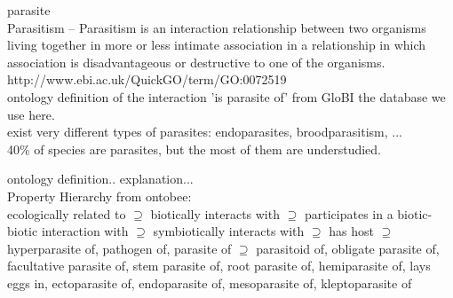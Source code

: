     \begin{definition} parasite \\
      Parasitism – Parasitism is an interaction relationship between two organisms living together in 
        more or less intimate association in a relationship in which association is disadvantageous or 
        destructive to one of the organisms. \\
      http://www.ebi.ac.uk/QuickGO/term/GO:0072519 \\
      ontology definition of the interaction 'is parasite of' from GloBI \cite{Poelen2014} the database we use here. \\
      exist very different types of parasites: endoparasites, broodparasitism, ... \\
      40\% of species are parasites, but the most of them are understudied. \cite{Windsor1998}
      
      ontology definition.. explanation... \\
      Property Hierarchy from ontobee: \\
      ecologically related to $\supseteq$ biotically interacts with $\supseteq$ participates in a 
        biotic-biotic interaction with $\supseteq$ symbiotically interacts with $\supseteq$ has host 
        $\supseteq$ hyperparasite of, pathogen of, parasite of $\supseteq$ parasitoid of, obligate 
        parasite of, facultative parasite of, stem parasite of, root parasite of, hemiparasite of, 
        lays eggs in, ectoparasite of, endoparasite of, mesoparasite of, kleptoparasite of
    \end{definition}


